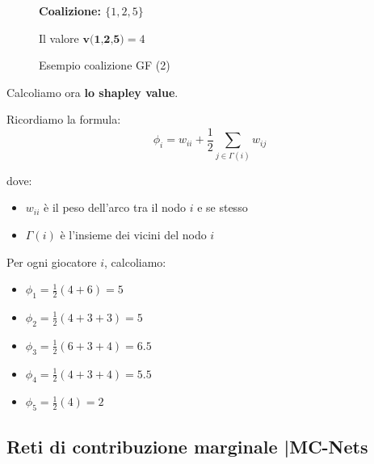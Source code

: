 \begin{figure}[H]
    \begin{center}
        \textbf{Coalizione: $\{1,2,5\}$}

        Il valore $\textbf{v(1,2,5)} = 4 $


    \end{center}
    \caption{Esempio coalizione GF (2)}
\end{figure}

Calcoliamo ora \textbf{lo shapley value}.

Ricordiamo la formula:
\[
    \phi_i = w_{ii} + \frac{1}{2} \sum_{j \in \Gamma(i)} w_{ij}
\]

dove:
\begin{itemize}
    \item $w_{ii}$ è il peso dell'arco tra il nodo $i$ e se stesso
    \item $\Gamma(i)$ è l'insieme dei vicini del nodo $i$
\end{itemize}

Per ogni giocatore $i$, calcoliamo:

\begin{itemize}
    \item $\phi_1 = \frac{1}{2} (4 + 6) = 5$
    \item $\phi_2 = \frac{1}{2} (4 + 3 + 3) = 5$
    \item $\phi_3 = \frac{1}{2} (6 + 3 + 4) = 6.5$
    \item $\phi_4 = \frac{1}{2} (4 + 3 + 4) = 5.5$
    \item $\phi_5 = \frac{1}{2} (4) = 2$
\end{itemize}

\subsection{Reti di contribuzione marginale |MC-Nets}
\label{MCnets}

